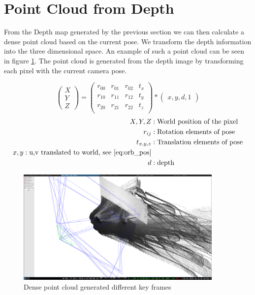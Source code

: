 \documentclass[11pt,a4paper,titlepage,oneside]{report}
\begin{document}
\section{Point Cloud from Depth}

From the Depth map generated by the previous section we can then calculate a dense point cloud based on the current pose. We transform the depth information into the three dimensional space. An example of such a point cloud can be seen in figure \ref{fig:pointcloud}. The point cloud is generated from the depth image by transforming each pixel with the current camera pose.

\begin{equation}\label{eq:point_cloud_depth}
	\begin{pmatrix}
			X \\
			Y \\
			Z
	\end{pmatrix}=
	\begin{pmatrix}
		r_{00} & r_{01} & r_{02} & t_x \\
		r_{10} & r_{11} & r_{12} & t_y \\
		r_{20} & r_{21} & r_{22} & t_z \\
	\end{pmatrix}*
	\begin{pmatrix}
		x,
		y,
		d,
		1
	\end{pmatrix}
\end{equation}
\begin{align*}
	X,Y,Z &:			\text{World position of the pixel}\\
	r_{ij} &:			\text{Rotation elements of pose}\\
	t_{x,y,z} &:	\text{Translation elements of pose}\\
	x,y:					\text{u,v translated to world, see \ref{eq:orb_pos}}\\
	d &:					\text{depth}
\end{align*}

\begin{figure}[H]
  \begin{center}
		\includegraphics[width=0.9\textwidth]{img/pointcloud.png}
  \end{center}
	\caption{Dense point cloud generated different key frames}\label{fig:pointcloud}
\end{figure}
\end{document}
